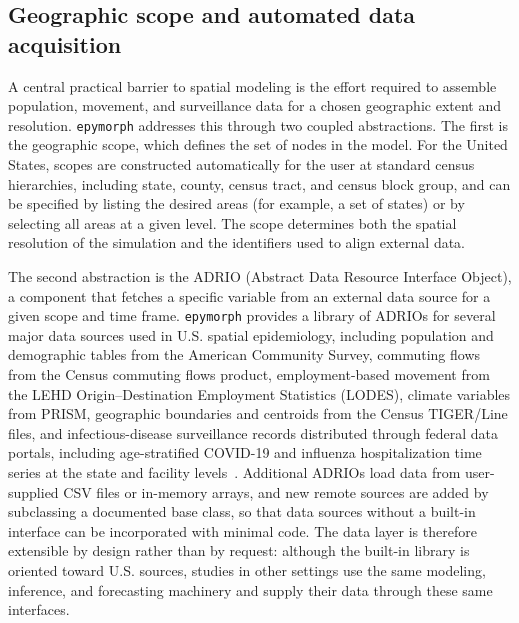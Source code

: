 
\subsection{Geographic scope and automated data acquisition}

A central practical barrier to spatial modeling is the effort required to assemble
population, movement, and surveillance data for a chosen geographic extent and resolution.
\texttt{epymorph} addresses this through two coupled abstractions. The first is the
geographic scope, which defines the set of nodes in the model. For the United States, scopes
are constructed automatically for the user at standard census hierarchies, including state,
county, census tract, and census block group, and can be specified by listing the desired
areas (for example, a set of states) or by selecting all areas at a given level. The scope
determines both the spatial resolution of the simulation and the identifiers used to align
external data.

The second abstraction is the ADRIO (Abstract Data Resource Interface Object), a component
that fetches a specific variable from an external data source for a given scope and time
frame. \texttt{epymorph} provides a library of ADRIOs for several major data sources used in
U.S. spatial epidemiology, including population and demographic tables from the American
Community Survey, commuting flows from the Census commuting flows product, employment-based
movement from the LEHD Origin--Destination Employment Statistics (LODES), climate variables
from PRISM, geographic boundaries and centroids from the Census TIGER/Line files, and
infectious-disease surveillance records distributed through federal data portals, including
age-stratified COVID-19 and influenza hospitalization time series at the state and facility
levels~\citep{harris_array_2020,bureau_american_nodate,us_census_bureau_center_for_economic_studies_us_nodate,noauthor_prism_nodate}. Additional ADRIOs load data from user-supplied CSV files or in-memory
arrays, and new remote sources are added by subclassing a documented base class, so that
data sources without a built-in interface can be incorporated with minimal code. The data
layer is therefore extensible by design rather than by request: although the built-in
library is oriented toward U.S. sources, studies in other settings use the same modeling,
inference, and forecasting machinery and supply their data through these same interfaces.

